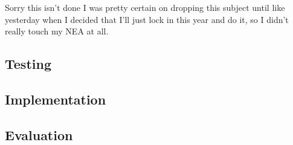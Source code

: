 \documentclass[11pt]{article}
\begin{document}
                Sorry this isn't done I was pretty certain on dropping this subject until like yesterday when I decided that I'll just lock in this year and do it, so I didn't really touch my NEA at all.
                
            
        \subsection{Testing}
        \subsection{Implementation}
        \subsection{Evaluation}
\end{document}
